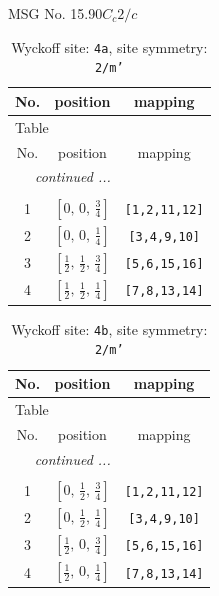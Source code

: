 \documentclass[fleqn,8pt]{jsarticle}
\begin{document}
\setcounter{MaxMatrixCols}{32}

\renewcommand{\tablename}{Table~}
\renewcommand{\figurename}{Figure~}
\begin{center}
\LARGE
MSG No. 15.90\quad$C_{c}2/c$
\end{center}
\renewcommand{\arraystretch}{1.2}
\begin{longtable}{ccc}
\caption{Wyckoff site: {\tt 4a}, site symmetry: {\tt 2/m'}}
 \\
 \hline \hline
No. & position & mapping \\ \hline \endfirsthead

\multicolumn{2}{l}{\tablename\ \thetable{}} \\
 \hline \hline
No. & position & mapping \\ \hline \endhead

 \hline \hline
\multicolumn{2}{r}{\footnotesize\it continued ...} \\ \endfoot

 \hline \hline
\multicolumn{2}{r}{} \\ \endlastfoot

1 & $\left[ 0,\, 0,\, \frac{3}{4} \right]$ & {\tt [1,2,11,12]} \\ \hline
2 & $\left[ 0,\, 0,\, \frac{1}{4} \right]$ & {\tt [3,4,9,10]} \\ \hline
3 & $\left[ \frac{1}{2},\, \frac{1}{2},\, \frac{3}{4} \right]$ & {\tt [5,6,15,16]} \\ \hline
4 & $\left[ \frac{1}{2},\, \frac{1}{2},\, \frac{1}{4} \right]$ & {\tt [7,8,13,14]} \\
\end{longtable}
\renewcommand{\arraystretch}{1.2}
\begin{longtable}{ccc}
\caption{Wyckoff site: {\tt 4b}, site symmetry: {\tt 2/m'}}
 \\
 \hline \hline
No. & position & mapping \\ \hline \endfirsthead

\multicolumn{2}{l}{\tablename\ \thetable{}} \\
 \hline \hline
No. & position & mapping \\ \hline \endhead

 \hline \hline
\multicolumn{2}{r}{\footnotesize\it continued ...} \\ \endfoot

 \hline \hline
\multicolumn{2}{r}{} \\ \endlastfoot

1 & $\left[ 0,\, \frac{1}{2},\, \frac{3}{4} \right]$ & {\tt [1,2,11,12]} \\ \hline
2 & $\left[ 0,\, \frac{1}{2},\, \frac{1}{4} \right]$ & {\tt [3,4,9,10]} \\ \hline
3 & $\left[ \frac{1}{2},\, 0,\, \frac{3}{4} \right]$ & {\tt [5,6,15,16]} \\ \hline
4 & $\left[ \frac{1}{2},\, 0,\, \frac{1}{4} \right]$ & {\tt [7,8,13,14]} \\
\end{longtable}
\end{document}
